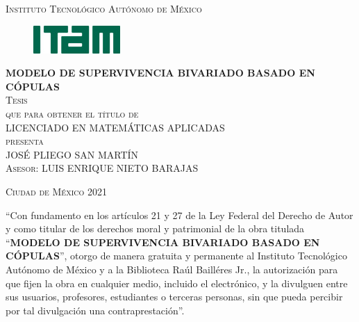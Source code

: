 \documentclass[11pt,a4paper]{article}
\begin{document}
\begin{titlepage}
\begin{center}

\textsc{\Large Instituto Tecnológico Autónomo de México}\\[4em]

\begin{figure}[h]
\begin{center}
\includegraphics{logo-ITAM_ch.jpg}
\end{center}
\end{figure}

\vspace{4em}

\textsc{\LARGE \textbf{MODELO DE SUPERVIVENCIA BIVARIADO BASADO EN CÓPULAS}}\\[4em]

\textsc{\large Tesis}\\[1em]

\textsc{que para obtener el título de}\\[1em]

\textsc{LICENCIADO EN MATEMÁTICAS APLICADAS}\\[1em]

\textsc{presenta}\\[1em]

\textsc{\Large JOSÉ PLIEGO SAN MARTÍN}\\[1em]

\textsc{\large Asesor: LUIS ENRIQUE NIETO BARAJAS}

\end{center}

\vspace*{\fill}
\textsc{Ciudad de México \hspace*{\fill} 2021}

\end{titlepage}

\thispagestyle{empty}
\vspace*{\fill}
\begingroup
``Con fundamento en los artículos 21 y 27 de la Ley Federal del Derecho de Autor y como titular de los derechos moral y patrimonial de la obra titulada ``\textbf{MODELO DE SUPERVIVENCIA BIVARIADO BASADO EN CÓPULAS}'', otorgo de manera gratuita y permanente al Instituto Tecnológico Autónomo de México y a la Biblioteca Raúl Bailléres Jr., la autorización para que fijen la obra en cualquier medio, incluido el electrónico, y la divulguen entre sus usuarios, profesores, estudiantes o terceras personas, sin que pueda percibir por tal divulgación una contraprestación''.
\end{document}
